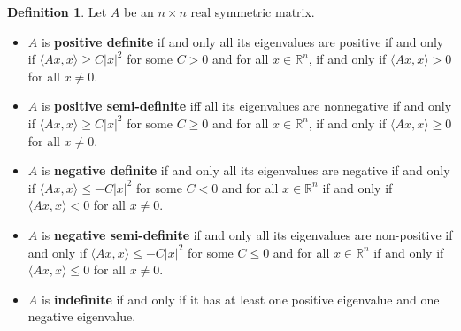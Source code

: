 \documentclass[11pt,openany]{book}
\theoremstyle{plain}
\theoremstyle{definition}
\newtheorem{definition}{Definition}[chapter]
\theoremstyle{remark}
\begin{document}
\begin{definition}
Let $A$ be an $n\times n$ real symmetric matrix.
\begin{itemize}
\item $A$ is \textbf{positive definite} if and only all its eigenvalues are positive if and only if $\langle Ax,x\rangle \geq  C|x|^2$ for some $C>0$ and for all $x\in \mathbb R^n$, if and only if $\langle Ax,x\rangle>0$ for all $x\neq 0$.
\item $A$ is \textbf{positive semi-definite} iff all its eigenvalues are nonnegative if and only if $\langle Ax,x\rangle \geq  C|x|^2$ for some $C\geq 0$ and for all $x\in \mathbb R^n$, if and only if $\langle Ax,x\rangle\geq 0$ for all $x\neq 0$.
\item $A$ is \textbf{negative definite} if and only all its eigenvalues are negative  if and only if $\langle Ax,x\rangle\leq -C|x|^2$ for some $C< 0$ and for all $x\in \mathbb R^n$ if and only if $\langle Ax,x\rangle<0$ for all $x\neq 0$.
\item $A$ is \textbf{negative semi-definite} if and only all its eigenvalues are non-positive if and only if $\langle Ax,x\rangle\leq -C|x|^2$ for some $C\leq 0$ and for all $x\in \mathbb R^n$ if and only if $\langle Ax,x\rangle\leq 0$ for all $x\neq 0$.
\item $A$ is \textbf{indefinite} if and only if it has at least one positive eigenvalue and one negative eigenvalue.
\end{itemize}
\end{definition}
\end{document}
